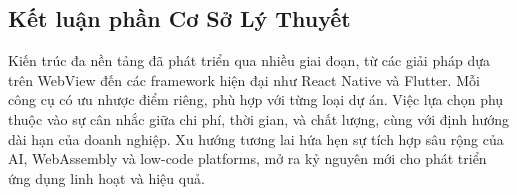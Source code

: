 \subsection{Kết luận phần Cơ Sở Lý Thuyết}
\renewcommand{\labelitemi}{--}    
    \begin{flushleft}
        \hspace*{0.8cm}Kiến trúc đa nền tảng đã phát triển qua nhiều giai đoạn, từ các giải pháp dựa trên WebView đến các framework hiện đại như React Native và Flutter. Mỗi công cụ có ưu nhược điểm riêng, phù hợp với từng loại dự án. Việc lựa chọn phụ thuộc vào sự cân nhắc giữa chi phí, thời gian, và chất lượng, cùng với định hướng dài hạn của doanh nghiệp. Xu hướng tương lai hứa hẹn sự tích hợp sâu rộng của AI, WebAssembly và low-code platforms, mở ra kỷ nguyên mới cho phát triển ứng dụng linh hoạt và hiệu quả.
    \end{flushleft}